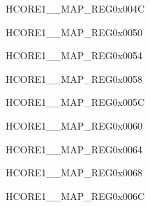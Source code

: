 \begin{register}{H}{CORE1\_\_MAP\_REG}{0x004C}\label{regdesc:CORE1LPSYSREGINTMAPREG}
\end{register}\vspace{-3em}


\begin{register}{H}{CORE1\_\_MAP\_REG}{0x0050}\label{regdesc:CORE1LPHUKINTMAPREG}
\end{register}\vspace{-3em}


\begin{register}{H}{CORE1\_\_MAP\_REG}{0x0054}\label{regdesc:CORE1SYSICMINTMAPREG}
\end{register}\vspace{-3em}


\begin{register}{H}{CORE1\_\_MAP\_REG}{0x0058}\label{regdesc:CORE1USBDEVICEINTMAPREG}
\end{register}\vspace{-3em}


\begin{register}{H}{CORE1\_\_MAP\_REG}{0x005C}\label{regdesc:CORE1SDIOHOSTINTMAPREG}
\end{register}\vspace{-3em}


\begin{register}{H}{CORE1\_\_MAP\_REG}{0x0060}\label{regdesc:CORE1AXIDMACINTMAPREG}
\end{register}\vspace{-3em}


\begin{register}{H}{CORE1\_\_MAP\_REG}{0x0064}\label{regdesc:CORE1SPI2INTMAPREG}
\end{register}\vspace{-3em}


\begin{register}{H}{CORE1\_\_MAP\_REG}{0x0068}\label{regdesc:CORE1SPI3INTMAPREG}
\end{register}\vspace{-3em}


\begin{register}{H}{CORE1\_\_MAP\_REG}{0x006C}\label{regdesc:CORE1I2S0INTMAPREG}
\end{register}\vspace{-3em}


